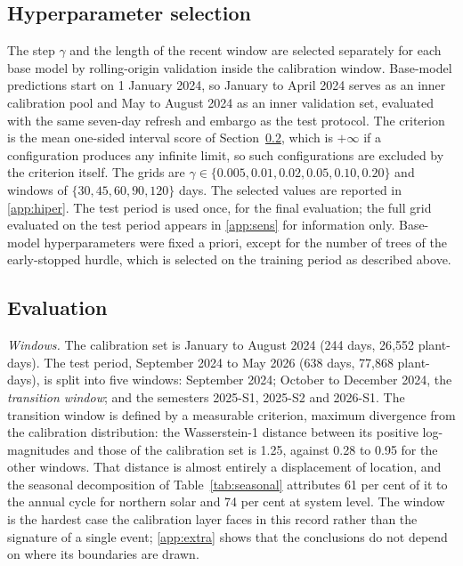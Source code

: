 \subsection{Hyperparameter selection}
\label{sec:seleccion}

The step $\gamma$ and the length of the recent window are selected separately for each base model by rolling-origin validation inside the calibration window. Base-model predictions start on 1 January 2024, so January to April 2024 serves as an inner calibration pool and May to August 2024 as an inner validation set, evaluated with the same seven-day refresh and embargo as the test protocol. The criterion is the mean one-sided interval score of Section~\ref{sec:evaluacion}, which is $+\infty$ if a configuration produces any infinite limit, so such configurations are excluded by the criterion itself. The grids are $\gamma\in\{0.005,0.01,0.02,0.05,0.10,0.20\}$ and windows of $\{30,45,60,90,120\}$ days. The selected values are reported in \ref{app:hiper}. The test period is used once, for the final evaluation; the full grid evaluated on the test period appears in \ref{app:sens} for information only. Base-model hyperparameters were fixed a priori, except for the number of trees of the early-stopped hurdle, which is selected on the training period as described above.

\subsection{Evaluation}
\label{sec:evaluacion}

\emph{Windows.} The calibration set is January to August 2024 (244 days, 26{,}552 plant-days). The test period, September 2024 to May 2026 (638 days, 77{,}868 plant-days), is split into five windows: September 2024; October to December 2024, the \emph{transition window}; and the semesters 2025-S1, 2025-S2 and 2026-S1. The transition window is defined by a measurable criterion, maximum divergence from the calibration distribution: the Wasserstein-1 distance between its positive log-magnitudes and those of the calibration set is 1.25, against 0.28 to 0.95 for the other windows. That distance is almost entirely a displacement of location, and the seasonal decomposition of Table~\ref{tab:seasonal} attributes 61 per cent of it to the annual cycle for northern solar and 74 per cent at system level. The window is the hardest case the calibration layer faces in this record rather than the signature of a single event; \ref{app:extra} shows that the conclusions do not depend on where its boundaries are drawn.

